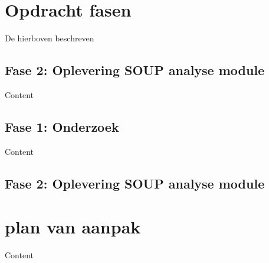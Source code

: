 \section{Opdracht fasen}
De hierboven beschreven  

\subsection{Fase 2: Oplevering SOUP analyse module}

Content
\subsection{Fase 1: Onderzoek}

Content
\subsection{Fase 2: Oplevering SOUP analyse module}

\section{plan van aanpak}

Content

